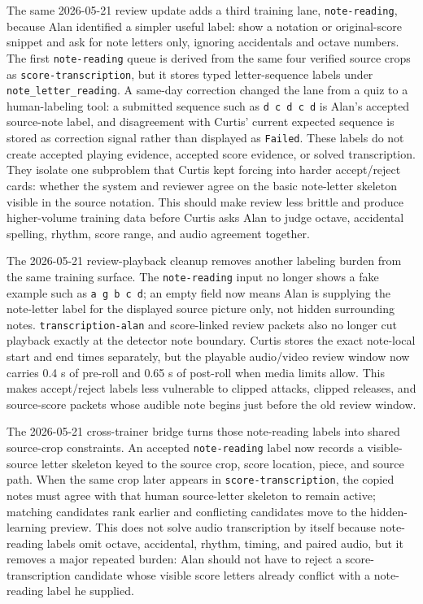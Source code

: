 The same 2026-05-21 review update adds a third training lane, \texttt{note-reading}, because Alan identified a simpler useful label: show a notation or original-score snippet and ask for note letters only, ignoring accidentals and octave numbers. The first \texttt{note-reading} queue is derived from the same four verified source crops as \texttt{score-transcription}, but it stores typed letter-sequence labels under \texttt{note\_letter\_reading}. A same-day correction changed the lane from a quiz to a human-labeling tool: a submitted sequence such as \texttt{d c d c d} is Alan's accepted source-note label, and disagreement with Curtis' current expected sequence is stored as correction signal rather than displayed as \texttt{Failed}. These labels do not create accepted playing evidence, accepted score evidence, or solved transcription. They isolate one subproblem that Curtis kept forcing into harder accept/reject cards: whether the system and reviewer agree on the basic note-letter skeleton visible in the source notation. This should make review less brittle and produce higher-volume training data before Curtis asks Alan to judge octave, accidental spelling, rhythm, score range, and audio agreement together.

The 2026-05-21 review-playback cleanup removes another labeling burden from the same training surface. The \texttt{note-reading} input no longer shows a fake example such as \texttt{a g b c d}; an empty field now means Alan is supplying the note-letter label for the displayed source picture only, not hidden surrounding notes. \texttt{transcription-alan} and score-linked review packets also no longer cut playback exactly at the detector note boundary. Curtis stores the exact note-local start and end times separately, but the playable audio/video review window now carries 0.4 s of pre-roll and 0.65 s of post-roll when media limits allow. This makes accept/reject labels less vulnerable to clipped attacks, clipped releases, and source-score packets whose audible note begins just before the old review window.

The 2026-05-21 cross-trainer bridge turns those note-reading labels into shared source-crop constraints. An accepted \texttt{note-reading} label now records a visible-source letter skeleton keyed to the source crop, score location, piece, and source path. When the same crop later appears in \texttt{score-transcription}, the copied notes must agree with that human source-letter skeleton to remain active; matching candidates rank earlier and conflicting candidates move to the hidden-learning preview. This does not solve audio transcription by itself because note-reading labels omit octave, accidental, rhythm, timing, and paired audio, but it removes a major repeated burden: Alan should not have to reject a score-transcription candidate whose visible score letters already conflict with a note-reading label he supplied.

